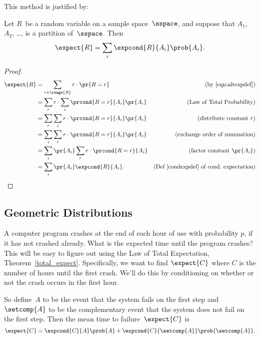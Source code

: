 This method is justified by:

\begin{theorem}\label{total_expect} %
Let $R$~be a random variable on a sample space~$\sspace$, and suppose
that $A_1$, $A_2$, \dots, is a partition of~$\sspace$.  Then
\[
    \expect{R} = \sum_i \expcond{R}{A_i} \prob{A_i}.
\]
\end{theorem}

\begin{proof}
  \begin{align*}
    \expect{R} & = \sum_{r \in \range{R}} r \cdot \pr{R=r}
                   & \text{(by~\ref{eqn:altexpdef})}\\
    &= \sum_r r \cdot \sum_i \prcond{R=r}{A_i} \pr{A_i}
            & \text{(Law of Total Probability)}\\
    &= \sum_r \sum_i r \cdot \prcond{R=r}{A_i} \pr{A_i}
              & \text{(distribute constant $r$)}\\
    &= \sum_i \sum_r r \cdot \prcond{R=r}{A_i} \pr{A_i}
              & \text{(exchange order of summation)}\\
    &= \sum_i \pr{A_i} \sum_r r \cdot \prcond{R=r}{A_i}
             & \text{(factor constant $\pr{A_i}$)}\\
    &= \sum_i \pr{A_i} \expcond{R}{A_i}.
             & \text{(Def~\ref{condexpdef} of cond.\ expectation)}
  \end{align*}
\end{proof}

\subsection{Geometric Distributions}\label{mean_time_to_failure_subsec}

A computer program crashes at the end of each hour of use with
probability $p$, if it has not crashed already.  What is the expected
time until the program crashes?  This will be easy to figure out using
the  Law of Total Expectation,
Theorem~\ref{total_expect}.  Specifically, we want to find
$\expect{C}$ where $C$ is the number of hours until the first crash.
We'll do this by conditioning on whether or not the crash occurs in
the first hour.

So define~$A$ to be the event that the system fails on the first step and
$\setcomp{A}$ to be the complementary event that the system does not fail
on the first step.  Then the mean time to failure~$\expect{C}$ is
\begin{equation}\label{eqn:17Y3}
    \expect{C} = \expcond{C}{A} \prob{A} + \expcond{C}{\setcomp{A}} \prob{\setcomp{A}}.
\end{equation}

